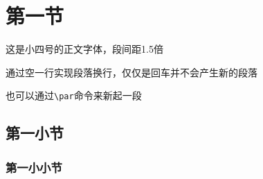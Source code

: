 \documentclass[supercite]{HustGraduTrans}
\begin{document}
    

    
    \section{第一节}
    这是小四号的正文字体，段间距1.5倍
    
    通过空一行实现段落换行，仅仅是回车并不会产生新的段落
    \par 也可以通过\verb|\par|命令来新起一段
    \subsection{第一小节}
    \subsubsection{第一小小节}
\end{document}
